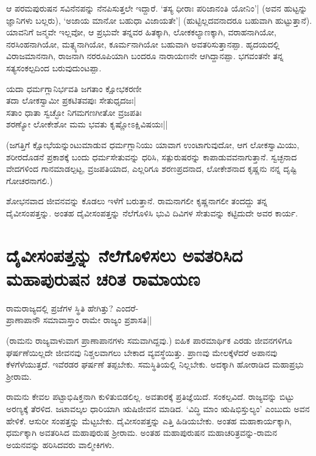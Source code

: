 ಆ ಪರಮಪುರುಷನ ಸವಿನೆನಪನ್ನು ನೆನಪಿಸುತ್ತಲೇ ಇದ್ದಾರೆ. `ತಸ್ಯ ಧೀರಾಃ ಪರಿಜಾನಂತಿ ಯೋನಿಂ'| (ಅವನ ಹುಟ್ಟನ್ನು ಜ್ಞಾನಿಗಳು ಬಲ್ಲರು), `ಅಜಾಯ ಮಾನೋ ಬಹುಧಾ ವಿಜಾಯತೇ'| (ಹುಟ್ಟಿಲ್ಲದವನಾದರೂ ಬಹುವಾಗಿ ಹುಟ್ಟುತ್ತಾನೆ). ಯಾವನಿಗೆ ಜನ್ಮವೇ ಇಲ್ಲವೋ, ಆ ಪ್ರಭುವೇ ತನ್ನವರ ಹಿತಕ್ಕಾಗಿ, ಲೋಕಕಲ್ಯಾಣಕ್ಕಾಗಿ, ವರಾಹನಾಗಿಯೋ, ನರಸಿಂಹನಾಗಿಯೋ, ಮತ್ಸ್ಯನಾಗಿಯೋ, ಕೂರ್ಮನಾಗಿಯೋ ಬಹುವಾಗಿ ಅವತರಿಸುತ್ತಾನಪ್ಪಾ. ಹೃದಯದಲ್ಲಿ ವಿರಾಜಮಾನನಾಗಿ, ರಾಜನಾಗಿ ನರರೂಪಿಯಾಗಿ ಬಂದರೂ ನಾರಾಯಣನೇ ಆಗಿದ್ದಾನಪ್ಪಾ. ಭಗವಂತನೇ ತನ್ನ ಸತ್ಯಸಂಕಲ್ಪದಿಂದ ಬರುವುದುಂಟಪ್ಪಾ. 

\begin{shloka} 
ಯದಾ ಧರ್ಮಗ್ಲಾನಿರ್ಭವತಿ ಜಗತಾಂ ಕ್ಷೋಭಕರಣೀ\\ 
ತದಾ ಲೋಕಸ್ವಾಮೀ ಪ್ರಕಟಿತವಪುಃ ಸೇತುಧೃದಜಃ|\\ 
ಸತಾಂ ಧಾತಾ ಸ್ವಚ್ಛೋ ನಿಗಮಗಣಗೀತೋ ವ್ರಜಪತಿಃ\\ 
ಶರಣ್ಯೋ ಲೋಕೇಶೋ ಮಮ ಭವತು ಕೃಷ್ಣೋಽಕ್ಷಿವಿಷಯಃ||
\end{shloka} 

(ಜಗತ್ತಿಗೆ ಕ್ಷೋಭೆಯನ್ನುಂಟುಮಾಡುವ ಧರ್ಮಗ್ಲಾನಿಯು ಯಾವಾಗ ಉಂಟಾಗುವುದೋ, ಆಗ ಲೋಕಸ್ವಾಮಿಯು, ಶರೀರದೊಡನೆ ಪ್ರಕಾಶಕ್ಕೆ ಬಂದು ಧರ್ಮಸೇತುವನ್ನು ಧರಿಸಿ, ಸತ್ಪುರುಷರನ್ನು ಕಾಪಾಡುವವನಾಗುತ್ತಾನೆ. ಸ್ವಚ್ಛನಾದ ವೇದಗಳಿಂದ ಗಾನಮಾಡಲ್ಪಟ್ಟ, ವ್ರಜಪತಿಯಾದ, ಎಲ್ಲರಿಗೂ ಶರಣಪ್ರದನಾದ, ಲೋಕೇಶನಾದ ಕೃಷ್ಣನು ನನ್ನ ದೃಷ್ಟಿ ಗೋಚರನಾಗಲಿ.) 

ಶೋಭನವಾದ ಜೀವನವನ್ನು ಕೊಡಲು ಇಳೆಗೆ ಬರುತ್ತಾನೆ. ರಾಮನಾಗಲೀ ಕೃಷ್ಣನಾಗಲೀ ತಂದದ್ದು ತನ್ನ ದೈವೀಸಂಪತ್ತನ್ನು. ಅಂತಹ ದೈವೀಸಂಪತ್ತನ್ನು ನೆಲೆಗೊಳಿಸಿ ಭುವಿ ದಿವಿಗಳ ಸೇತುವನ್ನು ಕಟ್ಟಿದುದೇ ಅವರ ಕಾರ್ಯ. 

\section*{ದೈವೀಸಂಪತ್ತನ್ನು ನೆಲೆಗೊಳಿಸಲು ಅವತರಿಸಿದ ಮಹಾಪುರುಷನ ಚರಿತ ರಾಮಾಯಣ} 

\begin{shloka} 
ರಾಮರಾಜ್ಯದಲ್ಲಿ ಪ್ರಜೆಗಳ ಸ್ಥಿತಿ ಹೇಗಿತ್ತು? ಎಂದರೆ-\\ 
ಪ್ರಾಣಾಪಾನೌ ಸಮಾವಾಸ್ತಾಂ ರಾಮೇ ರಾಜ್ಯಂ ಪ್ರಶಾಸತಿ||
\end{shloka} 

(ರಾಮನು ರಾಜ್ಯವಾಳುವಾಗ ಪ್ರಾಣಾಪಾನಗಳು ಸಮವಾಗಿದ್ದವು.) ಐಹಿಕ ಪಾರಮಾರ್ಥಿಕ ಎರಡು ಜೀವನಗಳಿಗೂ ಘರ್ಷಣೆಯಿಲ್ಲದೇ ಜೀವನವು ನಿಶ್ಚಲವಾಗಲು ಬೇಕಾದ ವ್ಯವಸ್ಥೆಯಿತ್ತು. ಪ್ರಾಣವು ಮೇಲಕ್ಕೆಳೆದರೆ ಅಪಾನವು ಕೆಳಗೆಳೆಯುತ್ತದೆ. ಇವೆರಡರ ಘರ್ಷಣೆ ತಪ್ಪಬೇಕು. ಸಮಸ್ಥಿತಿಯಲ್ಲಿ ನಿಲ್ಲಬೇಕು. ಅದಕ್ಕಾಗಿ ಹೋರಾಡಿದ ಮಹಾಪ್ರಭು ಶ್ರೀರಾಮ. 

ರಾಮನು ಕೇವಲ ಪಟ್ಟಾಭಿಷಿಕ್ತನಾಗಿ ಕುಳಿತುಬಿಡಲಿಲ್ಲ. ಅವತಾರಕ್ಕೆ ಪ್ರತಿಜ್ಞೆಯಿದೆ. ಸಂಕಲ್ಪವಿದೆ. ರಾಜ್ಯವನ್ನು ಬಿಟ್ಟು ಅರಣ್ಯಕ್ಕೆ ತೆರಳಿದ. ಜಟಾವಲ್ಕಲ ಧಾರಿಯಾಗಿ ಋಷಿಜೀವನ ಮಾಡಿದ. `ವಿದ್ಧಿ ಮಾಂ ಋಷಿಭಿಸ್ತುಲ್ಯಂ' ಎಂಬುದು ಅವನ ಹೇಳಿಕೆ. ಆಸುರೀ ಸಂಪತ್ತನ್ನು ಮೆಟ್ಟಬೇಕು. ದೈವೀಸಂಪತ್ತನ್ನು ಎತ್ತಿ ಹಿಡಿಯಬೇಕು. ಅಂತಹ ಮಹಾಕಾರ್ಯಕ್ಕಾಗಿ, ಧರ್ಮಕ್ಕಾಗಿ ಅವತರಿಸಿದ ಮಹಾಪುರುಷ ಶ್ರೀರಾಮ. ಅಂತಹ ಮಹಾಪುರುಷನ ಮಹಾಚರಿತ್ರವನ್ನು-ರಾಮನ ಅಯನವನ್ನು ಹರಿಸಿದವರು ವಾಲ್ಮೀಕಿಗಳು. 

